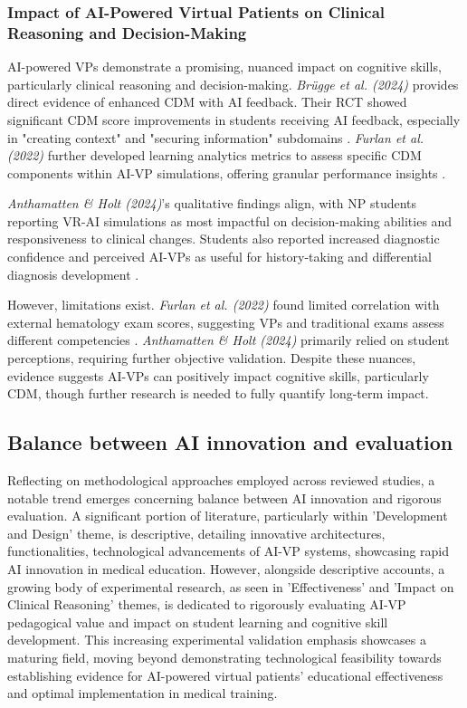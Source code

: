 \subsubsection*{\textbf{Impact of AI-Powered Virtual Patients on Clinical Reasoning and Decision-Making}}

AI-powered VPs demonstrate a promising, nuanced impact on cognitive skills, particularly clinical reasoning and decision-making. \textit{Brügge et al. (2024)} provides direct evidence of enhanced CDM with AI feedback. Their RCT showed significant CDM score improvements in students receiving AI feedback, especially in "creating context" and "securing information" subdomains \cite{brugge_large_2024}. \textit{Furlan et al. (2022)} further developed learning analytics metrics to assess specific CDM components within AI-VP simulations, offering granular performance insights \cite{furlan_learning_2022}.

\textit{Anthamatten \& Holt (2024)}'s qualitative findings align, with NP students reporting VR-AI simulations as most impactful on decision-making abilities and responsiveness to clinical changes. Students also reported increased diagnostic confidence and perceived AI-VPs as useful for history-taking and differential diagnosis development \cite{anthamatten_integrating_2024}.

However, limitations exist. \textit{Furlan et al. (2022)} found limited correlation with external hematology exam scores, suggesting VPs and traditional exams assess different competencies \cite{furlan_learning_2022}. \textit{Anthamatten \& Holt (2024)} primarily relied on student perceptions, requiring further objective validation. Despite these nuances, evidence suggests AI-VPs can positively impact cognitive skills, particularly CDM, though further research is needed to fully quantify long-term impact. \cite{anthamatten_integrating_2024}

\subsection*{\textbf{Balance between AI innovation and evaluation}}

Reflecting on methodological approaches employed across reviewed studies, a notable trend emerges concerning balance between AI innovation and rigorous evaluation. A significant portion of literature, particularly within 'Development and Design' theme, is descriptive, detailing innovative architectures, functionalities, technological advancements of AI-VP systems, showcasing rapid AI innovation in medical education. However, alongside descriptive accounts, a growing body of experimental research, as seen in 'Effectiveness' and 'Impact on Clinical Reasoning' themes, is dedicated to rigorously evaluating AI-VP pedagogical value and impact on student learning and cognitive skill development. This increasing experimental validation emphasis showcases a maturing field, moving beyond demonstrating technological feasibility towards establishing evidence for AI-powered virtual patients' educational effectiveness and optimal implementation in medical training.

